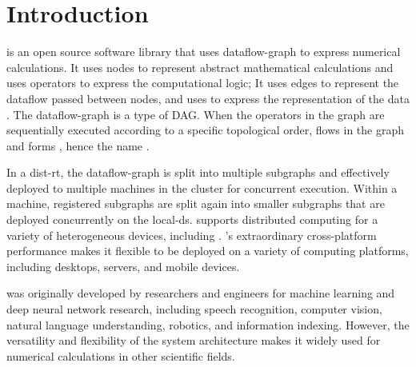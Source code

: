 \begin{savequote}[45mm]
\end{savequote}


\chapter{Introduction} 
\label{ch:introduction}

\begin{content}
\tf{} is an open source software library that uses \Gls{dataflow-graph} to express numerical calculations. It uses \glspl{node} to represent abstract mathematical calculations and uses \glspl{operator} to express the computational logic; It uses \glspl{edge} to represent the dataflow passed between \glspl{node}, and uses  to express the representation of the data . The \gls{dataflow-graph} is a type of \gls{DAG}. When the \glspl{operator} in the graph are sequentially executed according to a specific topological order,  flows in the graph and forms , hence the name \tf{}.

In a \gls{dist-rt}, the \gls{dataflow-graph} is split into multiple subgraphs and effectively deployed to multiple machines in the cluster for concurrent execution. Within a machine, registered subgraphs are split again into smaller subgraphs that are deployed concurrently on the \gls{local-ds}. \tf{} supports distributed computing for a variety of heterogeneous devices, including  . \tf{}'s extraordinary cross-platform performance makes it flexible to be deployed on a variety of computing platforms, including desktops, servers, and mobile devices.

\tf{} was originally developed by  researchers and engineers for machine learning and deep neural network research, including speech recognition, computer vision, natural  language understanding, robotics, and information indexing. However, the versatility and flexibility of the \tf{} system architecture makes it widely used for numerical calculations in other  scientific fields.
\end{content}



